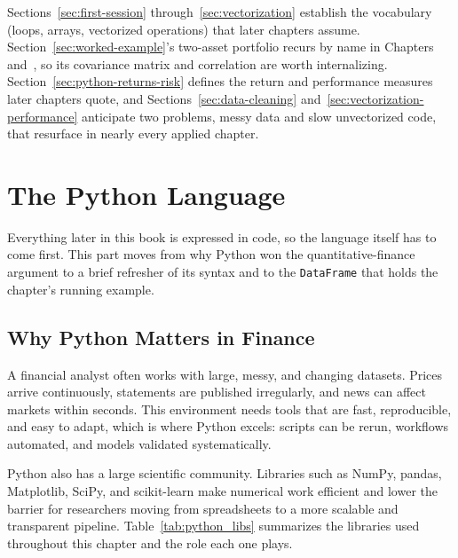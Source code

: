 \documentclass[../ai_in_finance]{subfiles}
\begin{document}
Sections~\ref{sec:first-session} through~\ref{sec:vectorization} establish the vocabulary (loops, arrays, vectorized operations) that later chapters assume. Section~\ref{sec:worked-example}'s two-asset portfolio recurs by name in Chapters~ and~, so its covariance matrix and correlation are worth internalizing. Section~\ref{sec:python-returns-risk} defines the return and performance measures later chapters quote, and Sections~\ref{sec:data-cleaning} and~\ref{sec:vectorization-performance} anticipate two problems, messy data and slow unvectorized code, that resurface in nearly every applied chapter.

\section{The Python Language}

Everything later in this book is expressed in code, so the language itself has to come first. This part moves from why Python won the quantitative-finance argument to a brief refresher of its syntax and to the \texttt{DataFrame} that holds the chapter's running example.

\subsection{Why Python Matters in Finance}

A financial analyst often works with large, messy, and changing datasets. Prices arrive continuously, statements are published irregularly, and news can affect markets within seconds. This environment needs tools that are fast, reproducible, and easy to adapt, which is where Python excels: scripts can be rerun, workflows automated, and models validated systematically.

Python also has a large scientific community. Libraries such as NumPy, pandas, Matplotlib, SciPy, and scikit-learn make numerical work efficient and lower the barrier for researchers moving from spreadsheets to a more scalable and transparent pipeline. Table~\ref{tab:python_libs} summarizes the libraries used throughout this chapter and the role each one plays.
\end{document}
